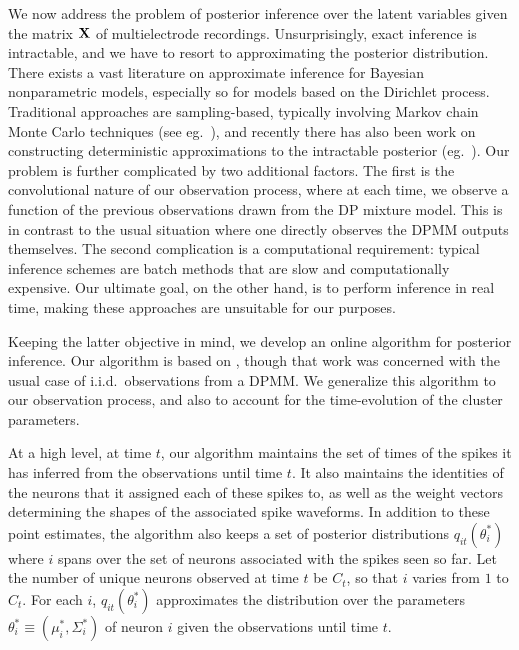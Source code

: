 \newcommand{\tx}{\tilde{x}}


We now address the problem of posterior inference over the latent variables given the matrix $\mathbf{X}$ of multielectrode recordings. Unsurprisingly, exact 
inference is intractable, and we have to resort to approximating the posterior distribution.
There exists a vast literature on approximate inference for Bayesian nonparametric models, especially so for models based on the Dirichlet process.
Traditional approaches are sampling-based, typically involving Markov chain Monte Carlo techniques (see eg.\ \citep{Nea2000, IshJam2001}), 
and recently there has also been work on constructing deterministic approximations to the intractable posterior (eg.\ \citep{BleJor2006, MinGha2003}).
Our problem is further complicated by two additional factors. The first is the convolutional nature of our observation process, 
where at each time,
we observe a function of the previous observations drawn from the DP mixture model. This is in contrast to the usual situation where one directly observes 
the DPMM outputs themselves.
The second complication is a computational requirement: typical inference schemes are batch methods that are slow and computationally expensive. 
Our ultimate goal, on the other hand, is to perform inference in real time, making these approaches are unsuitable for our purposes.

Keeping the latter objective in mind, we develop an online algorithm for posterior inference. Our algorithm is based on 
\citep{WangDun2009}, though that work was concerned with the usual case of i.i.d.\ observations from a DPMM. We generalize this algorithm to our 
observation process, and also to account for the time-evolution of the cluster parameters.

At a high level, at time $t$, our algorithm maintains the set of times of the spikes it has inferred from the observations until time $t$. It also maintains
the identities of the neurons that it assigned each of these spikes to, as well as the weight vectors determining the shapes of the associated spike 
waveforms. In addition to these point estimates, the algorithm also keeps a set of posterior distributions $q_{it}(\theta^*_i)$ where $i$ spans over the
set of neurons associated with the spikes seen so far. Let the number of unique neurons observed at time $t$ be $C_t$, so that $i$ varies from $1$ to $C_t$.
For each $i$, $q_{it}(\theta^*_i)$ approximates the distribution over the parameters 
$\theta_i^* \equiv (\mu_i^*, \Sigma_i^*)$ of neuron $i$ given the observations until time $t$. 

